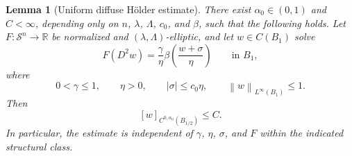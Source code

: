\documentclass[11pt,letterpaper]{amsart}
\numberwithin{equation}{section}
\newcommand{\Sn}{\mathcal S^n}
\newcommand{\norm}[1]{\left\lVert #1\right\rVert}
\newtheorem{lemma}[theorem]{Lemma}
\theoremstyle{definition}
\theoremstyle{remark}
\begin{document}
\begin{lemma}[Uniform diffuse H\"older estimate]
\label{lem:uniform-diffuse-holder}
There exist $\alpha_0\in(0,1)$ and $C<\infty$, depending only on
$n$, $\lambda$, $\Lambda$, $c_0$, and $\beta$, such that the following
holds.  Let $F:\Sn\to\mathbb R$ be normalized and
$(\lambda,\Lambda)$-elliptic, and let $w\in C(B_1)$ solve
\begin{equation}\label{eq:uniform-holder-equation}
F(D^2w)
=
\frac{\gamma}{\eta}
\beta\left(\frac{w+\sigma}{\eta}\right)
\qquad\text{in }B_1,
\end{equation}
where
$$
0<\gamma\leq1,
\qquad
\eta>0,
\qquad
|\sigma|\leq c_0\eta,
\qquad
\norm{w}_{L^\infty(B_1)}\leq1.
$$
Then
\begin{equation}\label{eq:uniform-holder-estimate}
[w]_{C^{0,\alpha_0}(B_{1/2})}
\leq C.
\end{equation}
In particular, the estimate is independent of $\gamma$, $\eta$, $\sigma$,
and $F$ within the indicated structural class.
\end{lemma}
\end{document}
